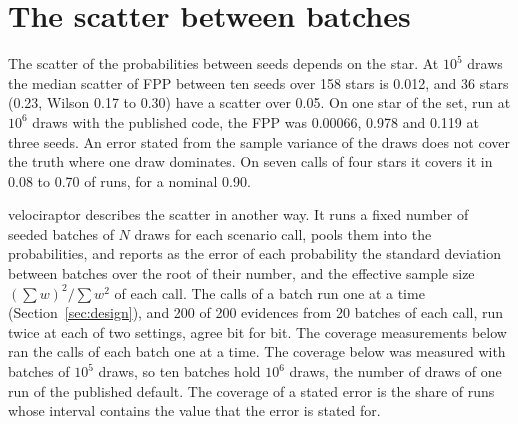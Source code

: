 \documentclass[11pt]{article}
\begin{document}
\section{The scatter between batches}\label{sec:stating}

The scatter of the probabilities between seeds depends on the star. At $10^{5}$ draws the median scatter of FPP between ten seeds over 158 stars is 0.012, and 36 stars (0.23, Wilson 0.17 to 0.30) have a scatter over 0.05. On one star of the set, run at $10^{6}$ draws with the published code, the FPP was 0.00066, 0.978 and 0.119 at three seeds. An error stated from the sample variance of the draws does not cover the truth where one draw dominates. On seven calls of four stars it covers it in 0.08 to 0.70 of runs, for a nominal 0.90.

velociraptor describes the scatter in another way. It runs a fixed number of seeded batches of $N$ draws for each scenario call, pools them into the probabilities, and reports as the error of each probability the standard deviation between batches over the root of their number, and the effective sample size $(\sum w)^{2}/\sum w^{2}$ of each call. The calls of a batch run one at a time (Section~\ref{sec:design}), and 200 of 200 evidences from 20 batches of each call, run twice at each of two settings, agree bit for bit. The coverage measurements below ran the calls of each batch one at a time. The coverage below was measured with batches of $10^{5}$ draws, so ten batches hold $10^{6}$ draws, the number of draws of one run of the published default. The coverage of a stated error is the share of runs whose interval contains the value that the error is stated for.
\end{document}
